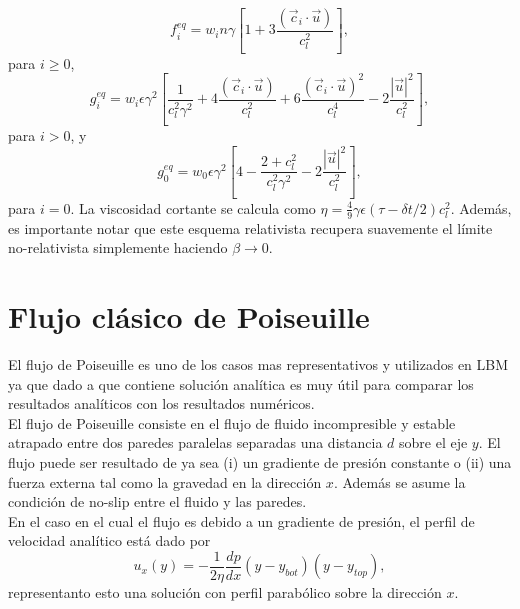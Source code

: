 \documentclass{article}
\begin{document}
   \begin{equation}
     f_i^{eq} = w_i n\gamma\left[ 1+3 \frac{(\vec{c}_i\cdot \vec{u})}{c_l^2} \right], 
 \end{equation}
 para $i\geq 0$, 
 \begin{equation}
     g_i^{eq} = w_i\epsilon\gamma^2\left[ \frac{1}{c_l^2\gamma^2}+4 \frac{(\vec{c}_i\cdot \vec{u})}{c_l^2}+ 6 \frac{(\vec{c}_i\cdot \vec{u})^2}{c_l^4}-2\frac{|\vec{u}|^2}{c_l^2} \right], 
 \end{equation}
  para $i> 0$, y
   \begin{equation}
     g_0^{eq} = w_0\epsilon\gamma^2\left[4- \frac{2+c_l^2}{c_l^2\gamma^2}-2\frac{|\vec{u}|^2}{c_l^2} \right], 
 \end{equation}
 para $i=0$. La viscosidad cortante se calcula como $\eta = \frac{4}{9} \gamma \epsilon (\tau-\delta t /2) c_l^2$. Además, es importante notar que este esquema relativista recupera suavemente el límite no-relativista simplemente haciendo $\beta \rightarrow 0$.
 
\section{Flujo clásico de Poiseuille}

El flujo de Poiseuille es uno de los casos mas representativos y utilizados en LBM ya que dado a que contiene solución analítica es muy útil para comparar los resultados analíticos con los resultados numéricos.\\

El flujo de Poiseuille consiste en el flujo de fluido incompresible y estable atrapado entre dos paredes paralelas separadas una distancia $d$ sobre el eje $y$. El flujo puede ser resultado de ya sea (i) un gradiente de presión constante o (ii) una fuerza externa tal como la gravedad en la dirección $x$. Además se asume la condición de no-slip entre el fluido y las paredes.\\

En el caso en el cual el flujo es debido a un gradiente de presión, el perfil de velocidad analítico está dado por
\begin{equation}
    u_x(y)= -\frac{1}{2\eta} \frac{dp}{dx} (y-y_{bot})(y-y_{top}),
\end{equation}
representanto esto una solución con perfil parabólico sobre la dirección $x$.\\
\end{document}
